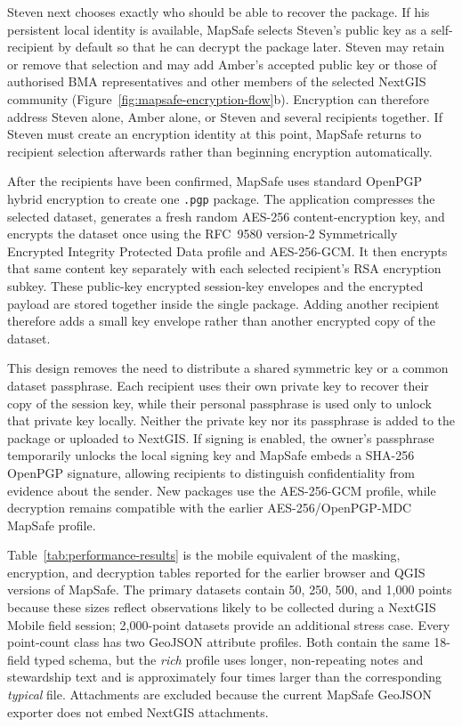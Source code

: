 \documentclass[a4paper,UKenglish,cleveref,autoref,thm-restate]{lipics-v2021}
\begin{document}
Steven next chooses exactly who should be able to recover the package. If his persistent local identity is available, MapSafe selects Steven's public key as a self-recipient by default so that he can decrypt the package later. Steven may retain or remove that selection and may add Amber's accepted public key or those of authorised BMA representatives and other members of the selected NextGIS community (Figure~\ref{fig:mapsafe-encryption-flow}b). Encryption can therefore address Steven alone, Amber alone, or Steven and several recipients together. If Steven must create an encryption identity at this point, MapSafe returns to recipient selection afterwards rather than beginning encryption automatically.

After the recipients have been confirmed, MapSafe uses standard OpenPGP hybrid encryption to create one \texttt{.pgp} package. The application compresses the selected dataset, generates a fresh random AES-256 content-encryption key, and encrypts the dataset once using the RFC~9580 version-2 Symmetrically Encrypted Integrity Protected Data profile and AES-256-GCM. It then encrypts that same content key separately with each selected recipient's RSA encryption subkey. These public-key encrypted session-key envelopes and the encrypted payload are stored together inside the single package. Adding another recipient therefore adds a small key envelope rather than another encrypted copy of the dataset.

This design removes the need to distribute a shared symmetric key or a common dataset passphrase. Each recipient uses their own private key to recover their copy of the session key, while their personal passphrase is used only to unlock that private key locally. Neither the private key nor its passphrase is added to the package or uploaded to NextGIS. If signing is enabled, the owner's passphrase temporarily unlocks the local signing key and MapSafe embeds a SHA-256 OpenPGP signature, allowing recipients to distinguish confidentiality from evidence about the sender. New packages use the AES-256-GCM profile, while decryption remains compatible with the earlier AES-256/OpenPGP-MDC MapSafe profile.







Table~\ref{tab:performance-results} is the mobile equivalent of the masking, encryption, and decryption tables reported for the earlier browser and QGIS versions of MapSafe. The primary datasets contain 50, 250, 500, and 1,000 points because these sizes reflect observations likely to be collected during a NextGIS Mobile field session; 2,000-point datasets provide an additional stress case. Every point-count class has two GeoJSON attribute profiles. Both contain the same 18-field typed schema, but the \emph{rich} profile uses longer, non-repeating notes and stewardship text and is approximately four times larger than the corresponding \emph{typical} file. Attachments are excluded because the current MapSafe GeoJSON exporter does not embed NextGIS attachments.
\end{document}
